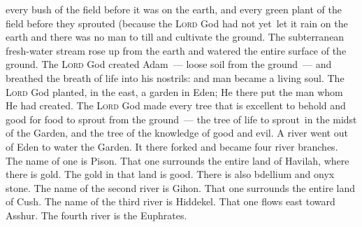 \begin{inparaenum}
   every bush of the field before it was on the earth, and every green plant of the field before they sprouted (because the \textsc{Lord} God had not yet\understood\ let it rain on the earth and there was no man to till and cultivate the ground.%
   The subterranean fresh-water stream rose up from the earth and watered the entire surface of the ground.%
   The \textsc{Lord} God created Adam~--- loose soil from the ground~--- and breathed the breath of life into his nostrils: and man became a living soul.%
   The \textsc{Lord} God planted, in the east, a garden in Eden; He there put the man whom He had created.%
   The \textsc{Lord} God made every tree that is excellent to behold and good for food to sprout from the ground~--- the tree of life to sprout\understood\ in the midst of the Garden, and the tree of the knowledge of good and evil.%
   A river went out of Eden to water the Garden. It there forked and became four river branches.%
   The name of one is Pison. That one surrounds the entire land of Havilah, where there is gold.%
   The gold in that land is good. There is also bdellium and onyx stone.%
   The name of the second river is Gihon. That one surrounds the entire land of Cush.%
   The name of the third river is Hiddekel. That one flows east toward Asshur. The fourth river is the Euphrates.%

\end{inparaenum}

